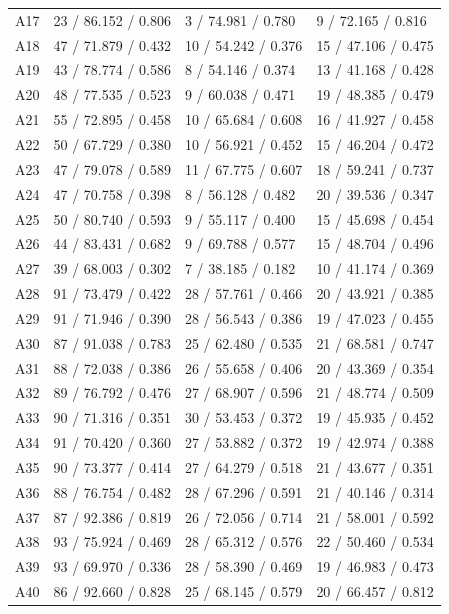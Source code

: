 \documentclass[10pt]{article}
\begin{document}
\begin{longtable}{llll}
A17 & 23 / 86.152 / 0.806 & 3 / 74.981 / 0.780 & 9 / 72.165 / 0.816 \\
A18 & 47 / 71.879 / 0.432 & 10 / 54.242 / 0.376 & 15 / 47.106 / 0.475 \\
A19 & 43 / 78.774 / 0.586 & 8 / 54.146 / 0.374 & 13 / 41.168 / 0.428 \\
A20 & 48 / 77.535 / 0.523 & 9 / 60.038 / 0.471 & 19 / 48.385 / 0.479 \\
A21 & 55 / 72.895 / 0.458 & 10 / 65.684 / 0.608 & 16 / 41.927 / 0.458 \\
A22 & 50 / 67.729 / 0.380 & 10 / 56.921 / 0.452 & 15 / 46.204 / 0.472 \\
A23 & 47 / 79.078 / 0.589 & 11 / 67.775 / 0.607 & 18 / 59.241 / 0.737 \\
A24 & 47 / 70.758 / 0.398 & 8 / 56.128 / 0.482 & 20 / 39.536 / 0.347 \\
A25 & 50 / 80.740 / 0.593 & 9 / 55.117 / 0.400 & 15 / 45.698 / 0.454 \\
A26 & 44 / 83.431 / 0.682 & 9 / 69.788 / 0.577 & 15 / 48.704 / 0.496 \\
A27 & 39 / 68.003 / 0.302 & 7 / 38.185 / 0.182 & 10 / 41.174 / 0.369 \\
A28 & 91 / 73.479 / 0.422 & 28 / 57.761 / 0.466 & 20 / 43.921 / 0.385 \\
A29 & 91 / 71.946 / 0.390 & 28 / 56.543 / 0.386 & 19 / 47.023 / 0.455 \\
A30 & 87 / 91.038 / 0.783 & 25 / 62.480 / 0.535 & 21 / 68.581 / 0.747 \\
A31 & 88 / 72.038 / 0.386 & 26 / 55.658 / 0.406 & 20 / 43.369 / 0.354 \\
A32 & 89 / 76.792 / 0.476 & 27 / 68.907 / 0.596 & 21 / 48.774 / 0.509 \\
A33 & 90 / 71.316 / 0.351 & 30 / 53.453 / 0.372 & 19 / 45.935 / 0.452 \\
A34 & 91 / 70.420 / 0.360 & 27 / 53.882 / 0.372 & 19 / 42.974 / 0.388 \\
A35 & 90 / 73.377 / 0.414 & 27 / 64.279 / 0.518 & 21 / 43.677 / 0.351 \\
A36 & 88 / 76.754 / 0.482 & 28 / 67.296 / 0.591 & 21 / 40.146 / 0.314 \\
A37 & 87 / 92.386 / 0.819 & 26 / 72.056 / 0.714 & 21 / 58.001 / 0.592 \\
A38 & 93 / 75.924 / 0.469 & 28 / 65.312 / 0.576 & 22 / 50.460 / 0.534 \\
A39 & 93 / 69.970 / 0.336 & 28 / 58.390 / 0.469 & 19 / 46.983 / 0.473 \\
A40 & 86 / 92.660 / 0.828 & 25 / 68.145 / 0.579 & 20 / 66.457 / 0.812 \\

\end{longtable}
\end{document}
